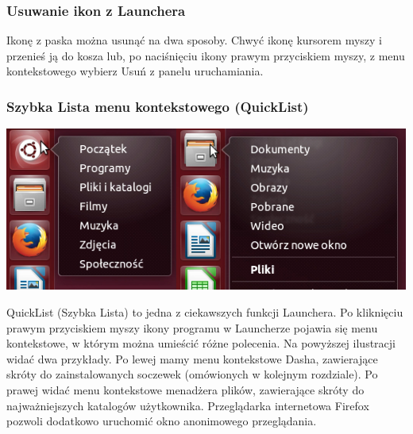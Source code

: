 \subsubsection{Usuwanie ikon z Launchera}
Ikonę z paska można usunąć na dwa sposoby. Chwyć ikonę kursorem myszy i przenieś ją do kosza lub, po naciśnięciu ikony prawym przyciskiem myszy, z menu kontekstowego wybierz \textcolor{ubuntu_orange}{Usuń z panelu uruchamiania}.

\subsubsection{Szybka Lista menu kontekstowego (QuickList)}
\begin{center}
	\includegraphics[width=\linewidth]{images/unity_launcher_quicklist.png}
\end{center}

QuickList (Szybka Lista) to jedna z ciekawszych funkcji Launchera. Po kliknięciu prawym przyciskiem myszy ikony programu w Launcherze pojawia się menu kontekstowe, w którym można umieścić różne polecenia. Na powyższej ilustracji widać dwa przykłady. Po lewej mamy menu kontekstowe Dasha, zawierające skróty do zainstalowanych soczewek (omówionych w kolejnym rozdziale). Po prawej widać menu kontekstowe menadżera plików, zawierające skróty do najważniejszych katalogów użytkownika. Przeglądarka internetowa Firefox pozwoli dodatkowo uruchomić okno anonimowego przeglądania.
\clearpage
